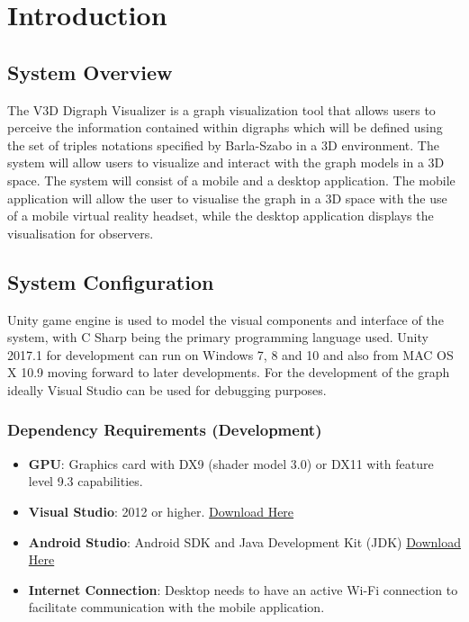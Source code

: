 \documentclass[english]{article}
\begin{document}

\newpage
{}
\thispagestyle{empty}
\tableofcontents
\clearpage

\setcounter{page}{1}

\section{Introduction}
\subsection{System Overview}
The V3D Digraph Visualizer is a graph visualization tool that allows users to perceive the information contained within digraphs which will be defined using the set of triples notations specified by Barla-Szabo in a 3D environment. The system will allow users to visualize and interact with the graph models in a 3D space. The system will consist of a mobile and a desktop application. The mobile application will allow the user to visualise the graph in a 3D space with the use of a mobile virtual reality headset, while the desktop application displays the visualisation for observers.

\subsection{System Configuration}
Unity game engine is used to model the visual components and interface of the system, with C Sharp being the primary programming language used. Unity 2017.1 for development can run on Windows 7, 8 and 10 and also from MAC OS X 10.9 moving forward to later developments. For the development of the graph ideally Visual Studio can be used for debugging purposes.

\subsubsection{Dependency Requirements (Development)} 

\begin{itemize}
  \item \textbf{GPU}: Graphics card with DX9 (shader model 3.0) or DX11 with feature level 9.3 capabilities.
  \item \textbf{Visual Studio}: 2012 or higher. \href{https://www.visualstudio.com/downloads/}{Download Here}
  \item \textbf{Android Studio}: Android SDK and Java Development Kit (JDK) \href{https://developer.android.com/studio/index.html}{Download Here}
  \item \textbf{Internet Connection}: Desktop needs to have an active Wi-Fi connection to facilitate communication with the mobile application.
  
\end{itemize}
\end{document}
